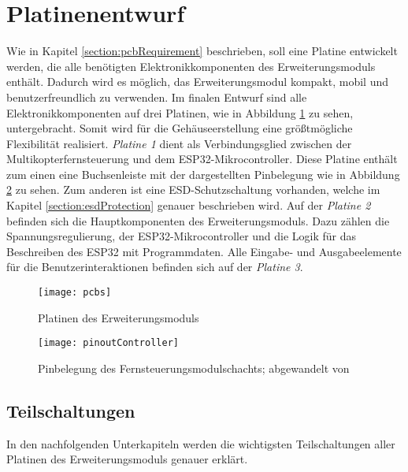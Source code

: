 \section{Platinenentwurf}
\label{section:pcbImplementation}
Wie in Kapitel \ref{section:pcbRequirement} beschrieben, soll eine Platine entwickelt werden, die alle benötigten Elektronikkomponenten des Erweiterungsmoduls enthält. Dadurch wird es möglich, das Erweiterungsmodul kompakt, mobil und benutzerfreundlich zu verwenden. Im finalen Entwurf sind alle Elektronikkomponenten auf drei Platinen, wie in Abbildung \ref{fig:pcbs} zu sehen, untergebracht. Somit wird für die Gehäuseerstellung eine größtmögliche Flexibilität realisiert. \textit{Platine 1} dient als Verbindungsglied zwischen der Multikopterfernsteuerung und dem ESP32-Mikrocontroller. Diese Platine enthält zum einen eine Buchsenleiste mit der dargestellten Pinbelegung wie in Abbildung \ref{fig:pinoutController} zu sehen. Zum anderen ist eine \ac{ESD}-Schutzschaltung vorhanden, welche im Kapitel \ref{section:esdProtection} genauer beschrieben wird. Auf der \textit{Platine 2} befinden sich die Hauptkomponenten des Erweiterungsmoduls. Dazu zählen die Spannungsregulierung, der ESP32-Mikrocontroller und die Logik für das Beschreiben des ESP32 mit Programmdaten. Alle Eingabe- und Ausgabeelemente für die Benutzerinteraktionen befinden sich auf der \textit{Platine 3}.

\begin{figure}[h]
    \centering
    \texttt{[image: pcbs]}
    \caption{Platinen des Erweiterungsmoduls}
    \label{fig:pcbs}
\end{figure}

\begin{figure}[h]
    \centering
    \texttt{[image: pinoutController]}
    \caption{Pinbelegung des Fernsteuerungsmodulschachts; abgewandelt von \cite{liteModulePinout}}
    \label{fig:pinoutController}
\end{figure}

\subsection{Teilschaltungen}
In den nachfolgenden Unterkapiteln werden die wichtigsten Teilschaltungen aller Platinen des Erweiterungsmoduls genauer erklärt.

